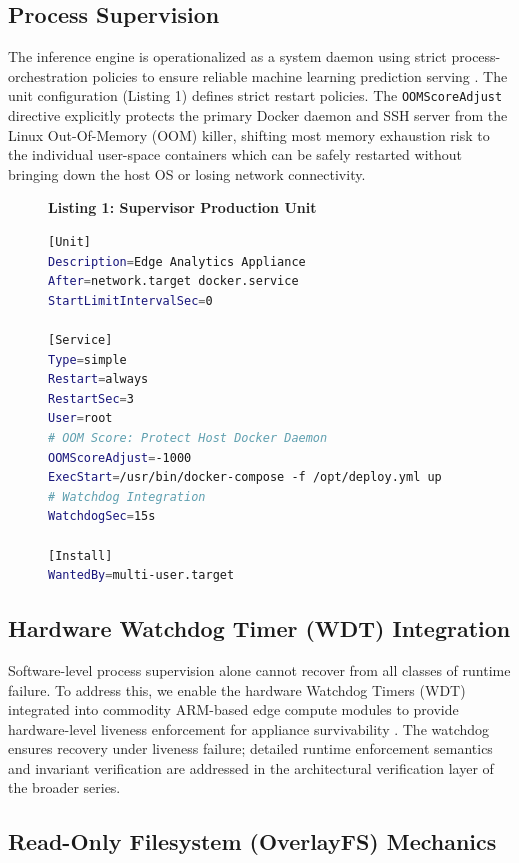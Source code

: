 \documentclass[conference]{IEEEtran}
\begin{document}
\subsection{Process Supervision}
The inference engine is operationalized as a system daemon using strict process-orchestration policies \cite{b16} to ensure reliable machine learning prediction serving \cite{b6}. The unit configuration (Listing 1) defines strict restart policies. The \texttt{OOMScoreAdjust} directive explicitly protects the primary Docker daemon and SSH server from the Linux Out-Of-Memory (OOM) killer, shifting most memory exhaustion risk to the individual user-space containers which can be safely restarted without bringing down the host OS or losing network connectivity.

\begin{figure}[htbp]
\textbf{Listing 1: Supervisor Production Unit}
\begin{lstlisting}[language=bash]
[Unit]
Description=Edge Analytics Appliance
After=network.target docker.service
StartLimitIntervalSec=0

[Service]
Type=simple
Restart=always
RestartSec=3
User=root
# OOM Score: Protect Host Docker Daemon
OOMScoreAdjust=-1000
ExecStart=/usr/bin/docker-compose -f /opt/deploy.yml up
# Watchdog Integration
WatchdogSec=15s

[Install]
WantedBy=multi-user.target
\end{lstlisting}
\label{fig:systemd}
\end{figure}

\subsection{Hardware Watchdog Timer (WDT) Integration}

Software-level process supervision alone cannot recover from all classes of runtime failure. To address this, we enable the hardware Watchdog Timers (WDT) integrated into commodity ARM-based edge compute modules to provide hardware-level liveness enforcement for appliance survivability \cite{b15}. The watchdog ensures recovery under liveness failure; detailed runtime enforcement semantics and invariant verification are addressed in the architectural verification layer of the broader series.

\subsection{Read-Only Filesystem (OverlayFS) Mechanics}
\end{document}
